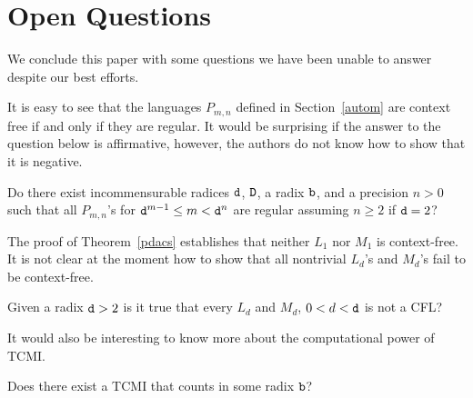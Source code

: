 \documentclass[12pt]{article}
\begin{document}
\section{Open Questions}

We conclude this paper with some questions we have been unable to
answer despite our best efforts.

It is easy to see that the languages $P_{m,n}$ defined in
Section~\ref{autom} are context free if and only if they are
regular. It would be surprising if the answer to the question below is
affirmative, however, the authors do not know how to show that it is negative.

\begin{question}
Do there exist incommensurable radices ${\tt d}$, ${\tt D}$, a radix ${\tt b}$, and a precision $n>0$ 
such that all $P_{m,n}$'s for ${\tt d}^{m-1}\leq m<{\tt d}^n$ are regular assuming $n\geq 2$ if ${\tt d}=2$?
\end{question}

The proof of Theorem~\ref{pdacs} establishes that neither $L_1$ nor $M_1$
is context-free. It is not clear at the moment how to show that all
nontrivial $L_d$'s and $M_d$'s fail to be context-free.
\begin{question}
Given a radix ${\tt d}>2$ is it true that every $L_d$ and $M_d$,
$0<d<{\tt d}$ is not a CFL?
\end{question}

It would also be interesting to know more about the computational
power of TCMI.

\begin{question}
Does there exist a TCMI that counts in some radix ${\tt b}$?
\end{question}
{}

\end{document}
